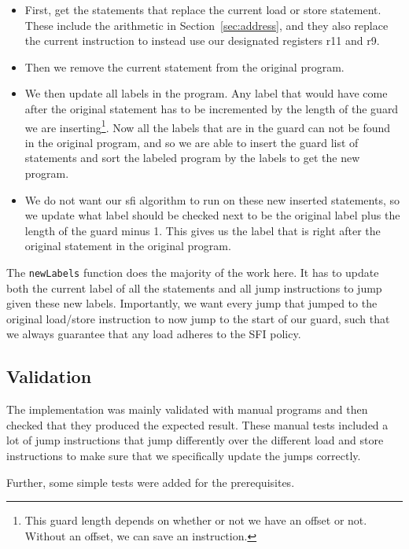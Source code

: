 \begin{itemize}
  \item First, get the statements that replace the current load or store
    statement. These include the arithmetic in Section~\ref{sec:address}, and
    they also replace the current instruction to instead use our designated
    registers r11 and r9.
  \item Then we remove the current statement from the original program.
  \item We then update all labels in the program. Any label that would have
    come after the original statement has to be incremented by the length of
    the guard we are inserting\footnote{This guard length depends on whether or
    not we have an offset or not. Without an offset, we can save an
  instruction.}. Now all the labels that are in the guard can not be found in
  the original program, and so we are able to insert the guard list of
  statements and sort the labeled program by the labels to get the new program.
  \item We do not want our sfi algorithm to run on these new inserted
    statements, so we update what label should be checked next to be the
    original label plus the length of the guard minus 1. This gives us the
    label that is right after the original statement in the original program.
\end{itemize}

The \texttt{newLabels} function does the majority of the work here. It has to
update both the current label of all the statements and all jump instructions
to jump given these new labels. Importantly, we want every jump that jumped to
the original load/store instruction to now jump to the start of our guard, such
that we always guarantee that any load adheres to the SFI policy.

\subsection{Validation}
The implementation was mainly validated with manual programs and then checked
that they produced the expected result. These manual tests included a lot of
jump instructions that jump differently over the different load and store
instructions to make sure that we specifically update the jumps correctly.

Further, some simple tests were added for the prerequisites.
